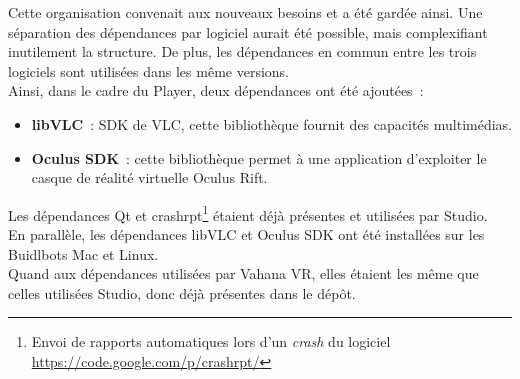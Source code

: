 Cette organisation convenait aux nouveaux besoins et a été gardée ainsi. Une séparation
des dépendances par logiciel aurait été possible, mais complexifiant inutilement 
la structure. De plus, les dépendances en commun entre les trois logiciels
sont utilisées dans les même versions. \\
\newline
Ainsi, dans le cadre du Player, deux dépendances ont été ajoutées~:
\begin{itemize}
  \item \textbf{libVLC}~: SDK de VLC, cette bibliothèque fournit des capacités multimédias.\cite{libvlc}
  \item \textbf{Oculus SDK}~: cette bibliothèque permet à une application d'exploiter le 
  casque de réalité virtuelle Oculus Rift.\cite{oculus-developer-guide}
\end{itemize}
Les dépendances Qt et crashrpt\footnote{Envoi de rapports automatiques lors d'un
\textit{crash} du logiciel \url{https://code.google.com/p/crashrpt/}} étaient déjà 
présentes et utilisées par Studio.\\
En parallèle, les dépendances libVLC et Oculus SDK ont été installées sur les Buidlbots Mac et Linux.\\
Quand aux dépendances utilisées par Vahana VR, elles étaient les même que celles 
utilisées Studio, donc déjà présentes dans le dépôt.\\

